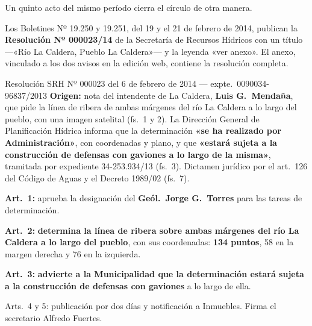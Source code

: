 \begin{cautela}
Un quinto acto del mismo período cierra el círculo de otra manera.

Los Boletines Nº 19.250 y 19.251, del 19 y el 21 de febrero de 2014, publican la \textbf{Resolución Nº 000023/14} de la Secretaría de Recursos Hídricos con un título ---«Río La Caldera, Pueblo La Caldera»--- y la leyenda «ver anexo». El anexo, vinculado a los dos avisos en la edición web, contiene la resolución completa.

\end{cautela}

\begin{ficha}{Resolución SRH Nº 000023 del 6 de febrero de 2014 --- expte.\ 0090034-96837/2013}
\textbf{Origen:} nota del intendente de La Caldera, \textbf{Luis G.\ Mendaña}, que pide la línea de ribera de ambas márgenes del río La Caldera a lo largo del pueblo, con una imagen satelital (fs.\ 1 y 2). La Dirección General de Planificación Hídrica informa que la determinación \textbf{«se ha realizado por Administración»}, con coordenadas y plano, y que \textbf{«estará sujeta a la construcción de defensas con gaviones a lo largo de la misma»}, tramitada por expediente 34-253.934/13 (fs.\ 3). Dictamen jurídico por el art.\ 126 del Código de Aguas y el Decreto 1989/02 (fs.\ 7).

\textbf{Art.\ 1:} aprueba la designación del \textbf{Geól.\ Jorge G.\ Torres} para las tareas de determinación.

\textbf{Art.\ 2:} \textbf{determina la línea de ribera sobre ambas márgenes del río La Caldera a lo largo del pueblo}, con sus coordenadas: \textbf{134 puntos}, 58 en la margen derecha y 76 en la izquierda.

\textbf{Art.\ 3:} \textbf{advierte a la Municipalidad que la determinación estará sujeta a la construcción de defensas con gaviones} a lo largo de ella.

Arts.\ 4 y 5: publicación por dos días y notificación a Inmuebles. Firma el secretario Alfredo Fuertes.
\end{ficha}

